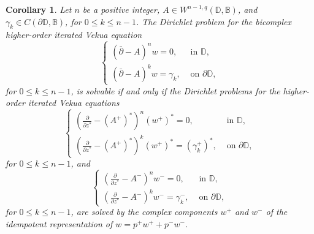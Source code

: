 \documentclass[12pt,reqno]{amsart}
\newtheorem{corr}[theorem]{Corollary}
\theoremstyle{definition}
\theoremstyle{remark}
\newcommand{\p}{\partial}
\newcommand{\dbar}{\bar\partial}
\newcommand{\bc}{\mathbb{B}}
\newcommand{\disk}{\mathbb{D}}
\begin{document}
            \begin{corr}\label{corr: hoivdirichletforalln}
                Let $n$ be a positive integer, $A \in W^{n-1,q}(\disk,\bc)$, and $\gamma_k \in C(\p\disk,\bc)$, for $0 \leq k \leq n-1$. The Dirichlet problem for the bicomplex higher-order iterated Vekua equation
                \[
                    \begin{cases}
                        (\dbar-A)^n w = 0, & \text{ in } \disk,\\
                        (\dbar - A)^k w = \gamma_k, & \text{ on } \p\disk,
                    \end{cases}
                \]
                for $0 \leq k \leq n-1$, is solvable if and only if the Dirichlet problems for the higher-order iterated Vekua equations
                \[
                    \begin{cases}
                        \left( \frac{\p}{\p z^*} - (A^+)^*\right)^n (w^+)^* = 0, & \text{ in } \disk,\\
                        \left( \frac{\p}{\p z^*} - (A^+)^*\right)^k (w^+)^* = (\gamma_k^+)^*, & \text{ on } \p\disk,
                    \end{cases}
                \]
                for $0 \leq k \leq n-1$, and
                \[
                    \begin{cases}
                        \left( \frac{\p}{\p z^*} - A^-\right)^n w^- = 0, & \text{ in } \disk,\\
                        \left( \frac{\p}{\p z^*} - A^-\right)^k w^- = \gamma_k^-, & \text{ on } \p\disk,
                    \end{cases}
                \]
                for $0 \leq k \leq n-1$, are solved by the complex components $w^+$ and $w^-$ of the idempotent representation of $w = p^+ w^+ + p^- w^-$.          
            \end{corr}

      
\end{document}
